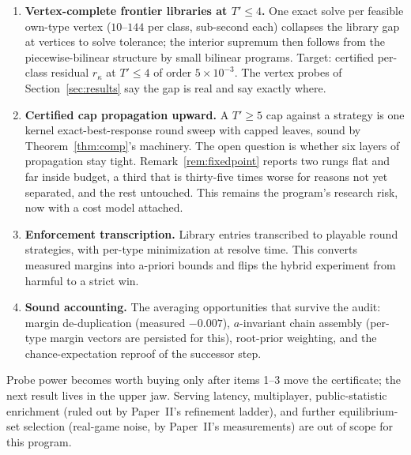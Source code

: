 \documentclass[11pt]{article}
\theoremstyle{plain}
\theoremstyle{definition}
\theoremstyle{remark}
\begin{document}
\begin{enumerate}\itemsep3pt
\item \textbf{Vertex-complete frontier libraries at $T'\le4$.} One
      exact solve per feasible own-type vertex ($10$--$144$ per class,
      sub-second each) collapses the library gap at vertices to solve
      tolerance; the interior supremum then follows from the
      piecewise-bilinear structure by small bilinear programs.
      Target: certified per-class residual $r_\kappa$ at $T'\le4$ of
      order $5\times10^{-3}$. The vertex probes of
      Section~\ref{sec:results} say the gap is real and say exactly
      where.
\item \textbf{Certified cap propagation upward.} A $T'{\ge}5$ cap
      against a strategy is one kernel exact-best-response round sweep
      with capped leaves, sound by Theorem~\ref{thm:comp}'s machinery.
      The open question is whether six layers of propagation stay
      tight. Remark~\ref{rem:fixedpoint} reports two rungs flat and far
      inside budget, a third that is thirty-five times worse for
      reasons not yet separated, and the rest untouched. This remains
      the program's research risk, now with a cost model attached.
\item \textbf{Enforcement transcription.} Library entries transcribed
      to playable round strategies, with per-type minimization at
      resolve time. This converts measured margins into a-priori
      bounds and flips the hybrid experiment from harmful to a strict
      win.
\item \textbf{Sound accounting.} The averaging opportunities that
      survive the audit: margin de-duplication (measured $-0.007$),
      $a$-invariant chain assembly (per-type margin vectors are
      persisted for this), root-prior weighting, and the
      chance-expectation reproof of the successor step.
\end{enumerate}

Probe power becomes worth buying only after items 1--3 move the
certificate; the next result lives in the upper jaw. Serving latency,
multiplayer, public-statistic enrichment (ruled out by Paper~II's
refinement ladder), and further equilibrium-set selection (real-game
noise, by Paper~II's measurements) are out of scope for this program.
\end{document}
